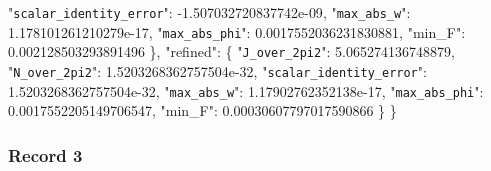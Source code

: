 \documentclass[
  10pt,
]{article}
\newenvironment{Shaded}{}{}
\newcommand{\DataTypeTok}[1]{\textcolor[rgb]{0.56,0.13,0.00}{#1}}
\newcommand{\FloatTok}[1]{\textcolor[rgb]{0.25,0.63,0.44}{#1}}
\newcommand{\FunctionTok}[1]{\textcolor[rgb]{0.02,0.16,0.49}{#1}}
\begin{document}
\begin{Shaded}
\begin{Highlighting}[]
    \DataTypeTok{"\nolinkurl{scalar_identity_error}"}\FunctionTok{:} \FloatTok{{-}1.507032720837742e{-}09}\FunctionTok{,}
    \DataTypeTok{"\nolinkurl{max_abs_w}"}\FunctionTok{:} \FloatTok{1.178101261210279e{-}17}\FunctionTok{,}
    \DataTypeTok{"\nolinkurl{max_abs_phi}"}\FunctionTok{:} \FloatTok{0.0017552036231830881}\FunctionTok{,}
    \DataTypeTok{"min\_F"}\FunctionTok{:} \FloatTok{0.002128503293891496}
  \FunctionTok{\},}
  \DataTypeTok{"refined"}\FunctionTok{:} \FunctionTok{\{}
    \DataTypeTok{"\nolinkurl{J_over_2pi2}"}\FunctionTok{:} \FloatTok{5.065274136748879}\FunctionTok{,}
    \DataTypeTok{"\nolinkurl{N_over_2pi2}"}\FunctionTok{:} \FloatTok{1.5203268362757504e{-}32}\FunctionTok{,}
    \DataTypeTok{"\nolinkurl{scalar_identity_error}"}\FunctionTok{:} \FloatTok{1.5203268362757504e{-}32}\FunctionTok{,}
    \DataTypeTok{"\nolinkurl{max_abs_w}"}\FunctionTok{:} \FloatTok{1.17902762352138e{-}17}\FunctionTok{,}
    \DataTypeTok{"\nolinkurl{max_abs_phi}"}\FunctionTok{:} \FloatTok{0.0017552205149706547}\FunctionTok{,}
    \DataTypeTok{"min\_F"}\FunctionTok{:} \FloatTok{0.00030607797017590866}
  \FunctionTok{\}}
\FunctionTok{\}}
\end{Highlighting}
\end{Shaded}

\hypertarget{record-3-3}{%
\subsubsection{Record 3}\label{record-3-3}}
\end{document}
